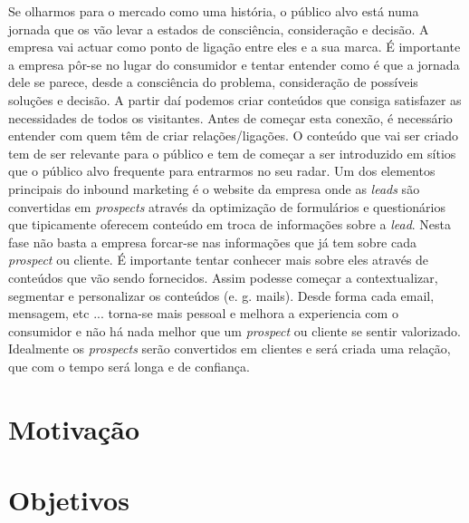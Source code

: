 Se olharmos para o mercado como uma história, o público alvo está numa jornada que os vão levar a estados de consciência, consideração e decisão. A empresa vai actuar como ponto de ligação entre eles e a sua marca.
É importante a empresa pôr-se no lugar do consumidor e tentar entender como é que a jornada dele se parece, desde a consciência do problema, consideração de possíveis soluções e decisão. A partir daí podemos criar conteúdos que consiga satisfazer as necessidades de todos os visitantes.
Antes de começar esta conexão, é necessário entender com quem têm de criar relações/ligações. O conteúdo que vai ser criado tem de ser relevante para o público e tem de começar a ser introduzido em sítios que o público alvo frequente para entrarmos no seu radar. 
Um dos elementos principais do inbound marketing é o website da empresa onde as \textit{leads} são convertidas em \textit{prospects} através da optimização de formulários e questionários que tipicamente oferecem conteúdo em troca de informações sobre a \textit{lead}. 
Nesta fase não basta a empresa forcar-se nas informações que já tem sobre cada \textit{prospect} ou cliente. É importante tentar conhecer mais sobre eles através de conteúdos que vão sendo fornecidos. Assim podesse começar a contextualizar, segmentar e personalizar os conteúdos (e. g. mails). Desde forma cada email, mensagem, etc ... torna-se mais pessoal e melhora a experiencia com o consumidor e não há nada melhor que um \textit{prospect} ou cliente se sentir valorizado.
Idealmente os \textit{prospects} serão convertidos em clientes e será criada uma relação, que com o tempo será longa e de confiança.



\section{Motivação}
\label{subsec:motivacao}



\section{Objetivos}
\label{subsec:objetivos}

